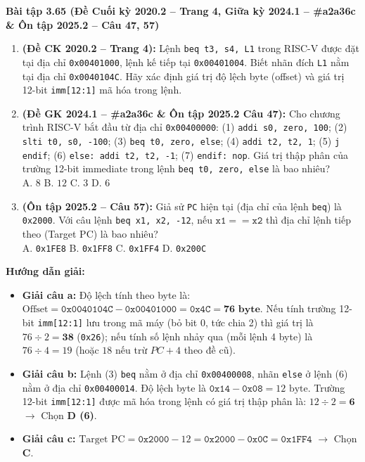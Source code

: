 \textbf{Bài tập 3.65 (Đề Cuối kỳ 2020.2 -- Trang 4, Giữa kỳ 2024.1 -- \#a2a36c \& Ôn tập 2025.2 -- Câu 47, 57)}
\begin{enumerate}[label=\alph*)]
    \item \textbf{(Đề CK 2020.2 -- Trang 4):} Lệnh \texttt{beq t3, s4, L1} trong RISC-V được đặt tại địa chỉ \texttt{0x00401000}, lệnh kế tiếp tại \texttt{0x00401004}. Biết nhãn đích \texttt{L1} nằm tại địa chỉ \texttt{0x0040104C}. Hãy xác định giá trị độ lệch byte (offset) và giá trị 12-bit \texttt{imm[12:1]} mã hóa trong lệnh.
    \item \textbf{(Đề GK 2024.1 -- \#a2a36c \& Ôn tập 2025.2 Câu 47):} Cho chương trình RISC-V bắt đầu từ địa chỉ \texttt{0x00400000}: (1) \texttt{addi s0, zero, 100}; (2) \texttt{slti t0, s0, -100}; (3) \texttt{beq t0, zero, else}; (4) \texttt{addi t2, t2, 1}; (5) \texttt{j endif}; (6) \texttt{else: addi t2, t2, -1}; (7) \texttt{endif: nop}. Giá trị thập phân của trường 12-bit immediate trong lệnh \texttt{beq t0, zero, else} là bao nhiêu?\\
    A. $8$ \qquad B. $12$ \qquad C. $3$ \qquad D. $6$
    \item \textbf{(Ôn tập 2025.2 -- Câu 57):} Giả sử \texttt{PC} hiện tại (địa chỉ của lệnh \texttt{beq}) là \texttt{0x2000}. Với câu lệnh \texttt{beq x1, x2, -12}, nếu $\texttt{x1} == \texttt{x2}$ thì địa chỉ lệnh tiếp theo (Target PC) là bao nhiêu?\\
    A. \texttt{0x1FE8} \qquad B. \texttt{0x1FF8} \qquad C. \texttt{0x1FF4} \qquad D. \texttt{0x200C}
\end{enumerate}
\textbf{Hướng dẫn giải:}
\begin{itemize}
    \item \textbf{Giải câu a:} Độ lệch tính theo byte là: $\text{Offset} = \texttt{0x0040104C} - \texttt{0x00401000} = \mathbf{\texttt{0x4C}} = \mathbf{76\text{ byte}}$. Nếu tính trường 12-bit \texttt{imm[12:1]} lưu trong mã máy (bỏ bit 0, tức chia 2) thì giá trị là $76 \div 2 = \mathbf{38}$ (\texttt{0x26}); nếu tính số lệnh nhảy qua (mỗi lệnh 4 byte) là $76 \div 4 = 19$ (hoặc $18$ nếu trừ $PC+4$ theo đề cũ).
    \item \textbf{Giải câu b:} Lệnh (3) \texttt{beq} nằm ở địa chỉ \texttt{0x00400008}, nhãn \texttt{else} ở lệnh (6) nằm ở địa chỉ \texttt{0x00400014}. Độ lệch byte là $\texttt{0x14} - \texttt{0x08} = 12\text{ byte}$. Trường 12-bit \texttt{imm[12:1]} được mã hóa trong lệnh có giá trị thập phân là: $12 \div 2 = \mathbf{6}$ $\rightarrow$ Chọn \textbf{D (6)}.
    \item \textbf{Giải câu c:} $\text{Target PC} = \texttt{0x2000} - 12 = \texttt{0x2000} - \texttt{0x0C} = \mathbf{\texttt{0x1FF4}}$ $\rightarrow$ Chọn \textbf{C}.
\end{itemize}

